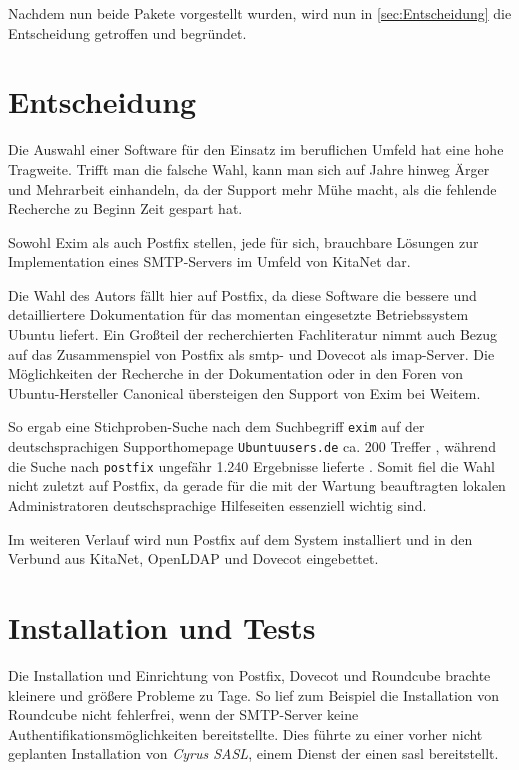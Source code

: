 Nachdem nun beide Pakete vorgestellt wurden, wird nun in \autoref{sec:Entscheidung} die Entscheidung getroffen und begründet.

\chapter{Entscheidung}
\label{sec:Entscheidung}

Die Auswahl einer Software für den Einsatz im beruflichen Umfeld hat eine hohe Tragweite. Trifft man die falsche Wahl, kann man sich auf Jahre hinweg Ärger und Mehrarbeit einhandeln, da der Support mehr Mühe macht, als die fehlende Recherche zu Beginn Zeit gespart hat.

Sowohl Exim als auch Postfix stellen, jede für sich, brauchbare Lösungen zur Implementation eines SMTP-Servers im Umfeld von KitaNet dar. 

Die Wahl des Autors fällt hier auf Postfix, da diese Software die bessere und detailliertere Dokumentation für das momentan eingesetzte Betriebssystem Ubuntu liefert. Ein Großteil der recherchierten Fachliteratur nimmt auch Bezug auf das Zusammenspiel von Postfix als \ac{smtp}- und Dovecot als \ac{imap}-Server.
Die Möglichkeiten der Recherche in der Dokumentation oder in den Foren von Ubuntu-Hersteller Canonical übersteigen den Support von Exim bei Weitem.

So ergab eine Stichproben-Suche nach dem Suchbegriff \verb+exim+ auf der deutschsprachigen Supporthomepage \verb+Ubuntuusers.de+ ca. 200 Treffer \citep[vgl.][]{googleexim}, während die Suche nach \verb+postfix+ ungefähr 1.240 Ergebnisse lieferte \citep[vgl.][]{googlepostfix}.
Somit fiel die Wahl nicht zuletzt auf Postfix, da gerade für die mit der Wartung beauftragten lokalen Administratoren deutschsprachige Hilfeseiten essenziell wichtig sind.

Im weiteren Verlauf wird nun Postfix auf dem System installiert und in den Verbund aus KitaNet, OpenLDAP und Dovecot eingebettet.

\chapter{Installation und Tests}

Die Installation und Einrichtung von Postfix, Dovecot und Roundcube brachte kleinere und größere Probleme zu Tage. 
So lief zum Beispiel die Installation von Roundcube nicht fehlerfrei, wenn der SMTP-Server keine Authentifikationsmöglichkeiten \citep[vgl. hierzu][]{rfc4954} bereitstellte. 
Dies führte zu einer vorher nicht geplanten Installation von \textit{Cyrus SASL}, einem Dienst der einen \ac{sasl} bereitstellt. 

